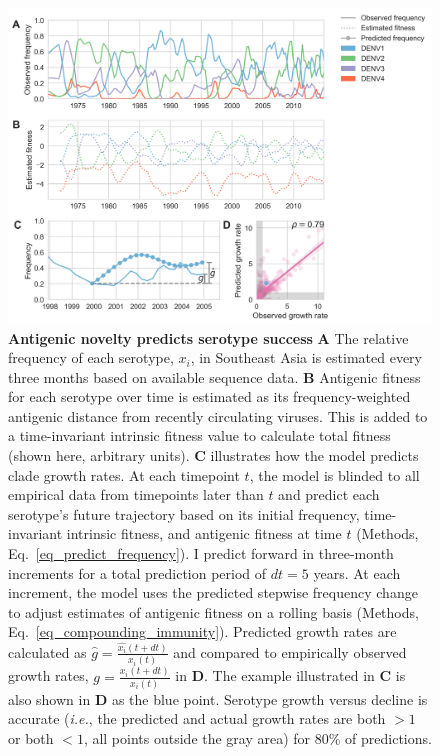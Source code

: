 \begin{figure}[ht!]
  \begin{centering}
    \includegraphics[width=.9\linewidth]{./png/serotype_fitness_model.png}
  	\caption[Antigenic novelty predicts serotype success]{\textbf{Antigenic novelty predicts serotype success }
    \textbf{A} The relative frequency of each serotype, $x_i$, in Southeast Asia is estimated every three months based on available sequence data.
    \textbf{B} Antigenic fitness for each serotype over time is estimated as its frequency-weighted antigenic distance from recently circulating viruses.
    This is added to a time-invariant intrinsic fitness value to calculate total fitness (shown here, arbitrary units).
    \textbf{C} illustrates how the model predicts clade growth rates.
    At each timepoint $t$, the model is blinded to all empirical data from timepoints later than $t$ and predict each serotype's future trajectory based on its initial frequency, time-invariant intrinsic fitness, and antigenic fitness at time $t$ (Methods, Eq.~\ref{eq_predict_frequency}).
    I predict forward in three-month increments for a total prediction period of $dt = 5$ years.
    At each increment, the model uses the predicted stepwise frequency change to adjust estimates of antigenic fitness on a rolling basis (Methods, Eq.~\ref{eq_compounding_immunity}).
    Predicted growth rates are calculated as $\hat{g} = \frac{\hat{x_i}(t+dt)}{x_i(t)}$ and compared to empirically observed growth rates, $g = \frac{x_i(t+dt)}{x_i(t)}$ in \textbf{D}.
    The example illustrated in \textbf{C} is also shown in \textbf{D} as the blue point.
    Serotype growth versus decline is accurate (\textit{i.e.}, the predicted and actual growth rates are both $>1$ or both $<1$, all points outside the gray area) for 80\% of predictions.
    }
  	\label{serotype_fitness_model}
  \end{centering}
\end{figure}

